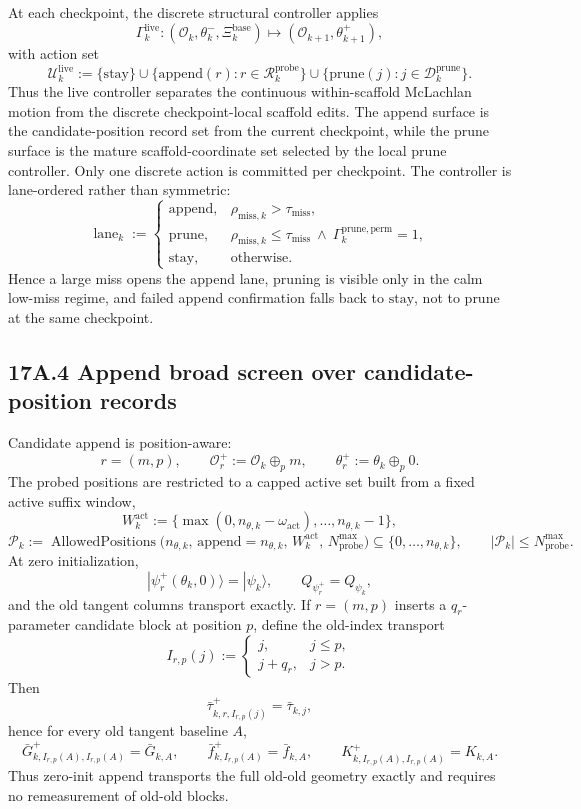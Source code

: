 \documentclass[11pt]{article}
\begin{document}
At each checkpoint, the discrete structural controller applies
\[
\Gamma_k^{\mathrm{live}}:
(\mathcal O_k,\theta_k^-,\Xi_k^{\mathrm{base}})
\longmapsto
(\mathcal O_{k+1},\theta_{k+1}^+),
\]
with action set
\[
\mathcal U_k^{\mathrm{live}}
:=
\{\mathrm{stay}\}
\cup
\{\mathrm{append}(r):r\in\mathcal R_k^{\mathrm{probe}}\}
\cup
\{\mathrm{prune}(j):j\in\mathcal D_k^{\mathrm{prune}}\}.
\]
Thus the live controller separates the continuous within-scaffold McLachlan motion from the discrete checkpoint-local scaffold edits. The append surface is the candidate-position record set from the current checkpoint, while the prune surface is the mature scaffold-coordinate set selected by the local prune controller. Only one discrete action is committed per checkpoint.
The controller is lane-ordered rather than symmetric:
\[
\operatorname{lane}_k
:=
\begin{cases}
\mathrm{append},&\rho_{\mathrm{miss},k}>\tau_{\mathrm{miss}},\\[2mm]
\mathrm{prune},&\rho_{\mathrm{miss},k}\le \tau_{\mathrm{miss}}\ \wedge\ \Gamma_k^{\mathrm{prune,perm}}=1,\\[2mm]
\mathrm{stay},&\text{otherwise.}
\end{cases}
\]
Hence a large miss opens the append lane, pruning is visible only in the calm low-miss regime, and failed append confirmation falls back to \(\mathrm{stay}\), not to prune at the same checkpoint.

\subsection*{17A.4 Append broad screen over candidate-position records}

Candidate append is position-aware:
\[
r=(m,p),
\qquad
\mathcal O_r^+:=\mathcal O_k\oplus_p m,
\qquad
\theta_r^+:=\theta_k\oplus_p 0.
\]
The probed positions are restricted to a capped active set built from a fixed active suffix window,
\[
W_k^{\mathrm{act}}
:=
\bigl\{\max(0,n_{\theta,k}-\omega_{\mathrm{act}}),\dots,n_{\theta,k}-1\bigr\},
\]
\[
\mathcal P_k
:=
\operatorname{AllowedPositions}\!\bigl(
n_{\theta,k},\,
\mathrm{append}=n_{\theta,k},\,
W_k^{\mathrm{act}},\,
N_{\mathrm{probe}}^{\max}
\bigr)
\subseteq
\{0,\dots,n_{\theta,k}\},
\qquad
|\mathcal P_k|\le N_{\mathrm{probe}}^{\max}.
\]
At zero initialization,
\[
|\psi_r^+(\theta_k,0)\rangle=|\psi_k\rangle,
\qquad
Q_{\psi_r^+}=Q_{\psi_k},
\]
and the old tangent columns transport exactly. If \(r=(m,p)\) inserts a \(q_r\)-parameter candidate block at position \(p\), define the old-index transport
\[
I_{r,p}(j)
:=
\begin{cases}
j,& j\le p,\\
j+q_r,& j>p.
\end{cases}
\]
Then
\[
\bar\tau_{k,r,I_{r,p}(j)}^+=\bar\tau_{k,j},
\]
hence for every old tangent baseline \(A\),
\[
\bar G_{k,I_{r,p}(A),I_{r,p}(A)}^+
=
\bar G_{k,A},
\qquad
\bar f_{k,I_{r,p}(A)}^+
=
\bar f_{k,A},
\qquad
K_{k,I_{r,p}(A),I_{r,p}(A)}^+
=
K_{k,A}.
\]
Thus zero-init append transports the full old-old geometry exactly and requires no remeasurement of old-old blocks.
\end{document}
